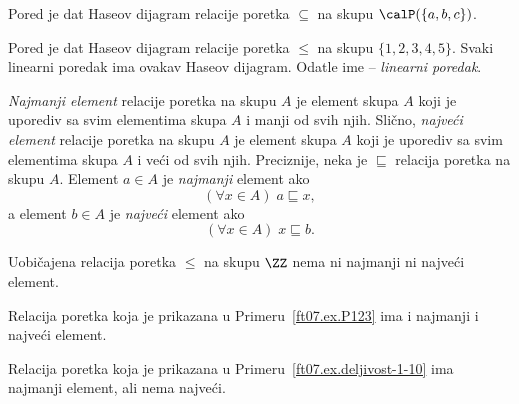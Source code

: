 \bigskip

\noindent
\begin{minipage}{3in}
  \begin{EX}\label{ft07.ex.P123}
    Pored je dat Haseov dijagram relacije poretka $\subseteq$ na skupu
    $\calP(\{a, b, c\})$.
  \end{EX}
\end{minipage}
\hfill
\begin{minipage}{2.5in}
  \begin{center}
    
  \end{center}
\end{minipage}

\bigskip

\noindent
\begin{minipage}{3in}
  \begin{EX}
    Pored je dat Haseov dijagram relacije poretka $\le$ na skupu
    $\{1, 2, 3, 4, 5\}$. Svaki linearni poredak ima ovakav Haseov dijagram.
    Odatle ime -- \emph{linearni poredak}.
  \end{EX}
\end{minipage}
\hfill
\begin{minipage}{2.5in}
  \begin{center}
    
  \end{center}
\end{minipage}

\bigskip

\emph{Najmanji element} relacije poretka na skupu $A$ je element skupa $A$ koji je uporediv sa svim elementima skupa $A$
i manji od svih njih. Sli\v cno, \emph{najve\'ci element} relacije poretka na skupu $A$ je element skupa $A$
koji je uporediv sa svim elementima skupa $A$ i ve\'ci od svih njih. Preciznije, neka je $\sqsubseteq$ relacija
poretka na skupu $A$. Element $a \in A$ je \emph{najmanji} element ako
$$
  (\forall x \in A) \; a \sqsubseteq x,
$$
a element $b \in A$ je \emph{najve\'ci} element ako
$$
  (\forall x \in A) \; x \sqsubseteq b.
$$

\begin{EX}\label{ft07.ex.delj-2-12}
  Uobi\v cajena relacija poretka $\le$ na skupu $\ZZ$ nema ni najmanji ni najve\'ci element.

  Relacija poretka koja je prikazana u Primeru~\ref{ft07.ex.P123} ima i najmanji i najve\'ci element.

  Relacija poretka koja je prikazana u Primeru~\ref{ft07.ex.deljivost-1-10} ima najmanji element, ali nema najve\'ci.
\end{EX}

